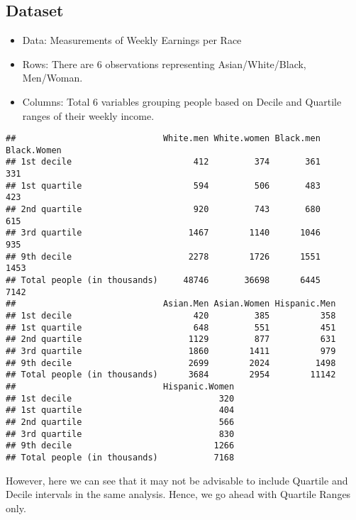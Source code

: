 \documentclass[]{book}
\providecommand{\tightlist}{%
  \setlength{\itemsep}{0pt}\setlength{\parskip}{0pt}}
\begin{document}
\hypertarget{dataset-1}{%
\subsection{Dataset}\label{dataset-1}}

\begin{itemize}
\tightlist
\item
  Data: Measurements of Weekly Earnings per Race
\item
  Rows: There are 6 observations representing Asian/White/Black,
  Men/Woman.
\item
  Columns: Total 6 variables grouping people based on Decile and
  Quartile ranges of their weekly income.
\end{itemize}

\begin{verbatim}
##                             White.men White.women Black.men Black.Women
## 1st decile                        412         374       361         331
## 1st quartile                      594         506       483         423
## 2nd quartile                      920         743       680         615
## 3rd quartile                     1467        1140      1046         935
## 9th decile                       2278        1726      1551        1453
## Total people (in thousands)     48746       36698      6445        7142
##                             Asian.Men Asian.Women Hispanic.Men
## 1st decile                        420         385          358
## 1st quartile                      648         551          451
## 2nd quartile                     1129         877          631
## 3rd quartile                     1860        1411          979
## 9th decile                       2699        2024         1498
## Total people (in thousands)      3684        2954        11142
##                             Hispanic.Women
## 1st decile                             320
## 1st quartile                           404
## 2nd quartile                           566
## 3rd quartile                           830
## 9th decile                            1266
## Total people (in thousands)           7168
\end{verbatim}

However, here we can see that it may not be advisable to include
Quartile and Decile intervals in the same analysis. Hence, we go ahead
with Quartile Ranges only.
\end{document}
